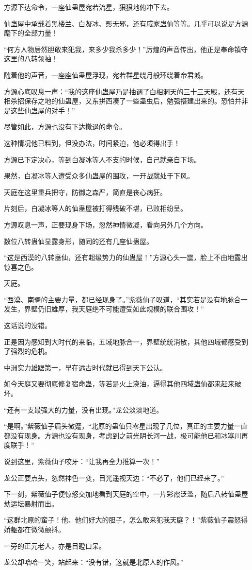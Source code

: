 \begin{this_body}
方源下达命令，一座仙蛊屋宛若流星，狠狠地俯冲下去。

仙蛊屋中承载着黑楼兰、白凝冰、影无邪，还有戚家蛊仙等等。几乎可以说是方源麾下的全部力量！

“何方人物居然胆敢来犯我，来多少我杀多少！”厉煌的声音传出，他正是奉命镇守这里的八转领袖！

随着他的声音，一座座仙蛊屋浮现，宛若群星绕月般环绕着帝君城。

方源心底叹息一声：“我的这座仙蛊屋乃是抽调了白相洞天的三十三天殿，还有天相杀招保存之地的仙蛊屋，又东拼西凑了一些蛊虫后，勉强搭建出来的。恐怕并非是这些仙蛊屋的对手！”

尽管如此，方源也没有下达撤退的命令。

这种情况他已料到，但没办法，时间紧迫，他必须得出手！

方源已下定决心，等到白凝冰等人不支的时候，自己就亲自下场。

果然，白凝冰等人遭受众多仙蛊屋的围攻，一开战就处于下风。

天庭在这里重兵把守，防御之森严，简直是丧心病狂。

片刻后，白凝冰等人的仙蛊屋被打得残破不堪，已败相纷呈。

方源叹息一声，正要现身下场，忽然神情微凝，看向另外几个方向。

数位八转蛊仙显露身形，随同的还有几座仙蛊屋。

“这是西漠的八转蛊仙，还有超级势力的仙蛊屋！”方源心头一震，脸上不由地露出惊喜之色。

天庭。

“西漠、南疆的主要力量，都已经现身了。”紫薇仙子叹道，“其实若是没有地脉合一发生，界壁仍旧雄厚，我天庭绝不可能遭受如此规模的联合围攻！”

这话说的没错。

正是因为感知到大时代的来临，五域地脉合一，界壁统统消散，其他四域都感受到了强烈的危机。

中洲实力雄踞第一，早在远古时代就已得到天下公认。

如今天庭又要彻底修复宿命蛊，等若是火上浇油，逼得其他四域蛊仙都来赶来破坏。

“还有一支最强大的力量，没有出现。”龙公淡淡地道。

“是啊。”紫薇仙子眉头微蹙，“北原的蛊仙只零星出现了几位，真正的主要力量一直都没有现身。方源也没有现身，考虑到之前光阴长河一战，极可能他已和冰塞川再度联手！”

说到这里，紫薇仙子咬牙：“让我再全力推算一次！”

龙公正要点头，忽然神色一变，目光遥视天边：“不必了，他们已经来了。”

下一刻，紫薇仙子便惊怒交加地看到天庭的空中，一片彩霞泛滥，随后八转仙蛊屋劫运坛暴射而出。

“这群北原的蛮子！他、他们好大的胆子，怎么敢来犯我天庭？！”紫薇仙子震怒得娇躯都在微微颤抖。

一旁的正元老人，亦是目瞪口呆。

龙公却哈哈一笑，站起来：“没有错，这就是北原人的作风。”

\end{this_body}

